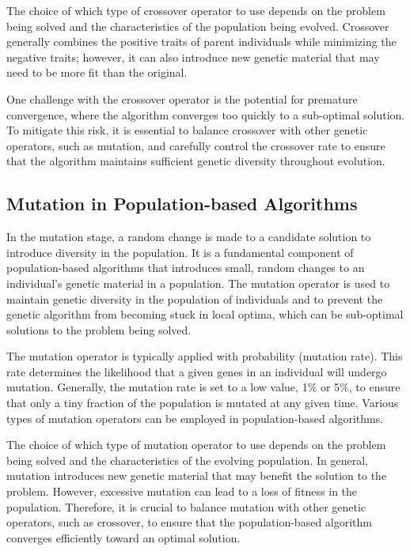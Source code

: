 \documentclass[runningheads]{llncs}
\begin{document}
The choice of which type of crossover operator to use depends on the problem being solved and the characteristics of the population being evolved. Crossover generally combines the positive traits of parent individuals while minimizing the negative traits; however, it can also introduce new genetic material that may need to be more fit than the original.

One challenge with the crossover operator is the potential for premature convergence, where the algorithm converges too quickly to a sub-optimal solution. To mitigate this risk, it is essential to balance crossover with other genetic operators, such as mutation, and carefully control the crossover rate to ensure that the algorithm maintains sufficient genetic diversity throughout evolution.

\subsection{Mutation in Population-based Algorithms}

In the mutation stage, a random change is made to a candidate solution to introduce diversity in the population. It is a fundamental component of population-based algorithms that introduces small, random changes to an individual's genetic material in a population. The mutation operator is used to maintain genetic diversity in the population of individuals and to prevent the genetic algorithm from becoming stuck in local optima, which can be sub-optimal solutions to the problem being solved.

The mutation operator is typically applied with probability (mutation rate)\cite{Greenwell-1995}. This rate determines the likelihood that a given genes in an individual will undergo mutation. Generally, the mutation rate is set to a low value, 1\% or 5\%, to ensure that only a tiny fraction of the population is mutated at any given time. Various types of mutation operators can be employed in population-based algorithms.

The choice of which type of mutation operator to use depends on the problem being solved and the characteristics of the evolving population. In general, mutation introduces new genetic material that may benefit the solution to the problem. However, excessive mutation can lead to a loss of fitness in the population. Therefore, it is crucial to balance mutation with other genetic operators, such as crossover, to ensure that the population-based algorithm converges efficiently toward an optimal solution.
\end{document}
